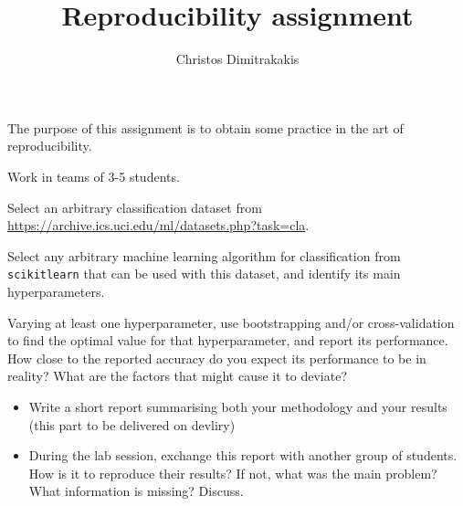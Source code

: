 \documentclass[a4paper]{article}
\title{Reproducibility assignment}
\author{Christos Dimitrakakis}
\begin{document}
\maketitle
The purpose of this assignment is to obtain some practice in the art of reproducibility.

\begin{exercise}
  Work in teams of 3-5 students.

  Select an arbitrary classification dataset from \url{https://archive.ics.uci.edu/ml/datasets.php?task=cla}. 

  Select any arbitrary machine learning algorithm for classification
  from \texttt{scikitlearn} that can be used with this dataset, and identify its main hyperparameters.
    
  Varying at least one hyperparameter, use bootstrapping and/or
  cross-validation to find the optimal value for that hyperparameter,
  and report its performance. How close to the reported accuracy do
  you expect its performance to be in reality?  What are the factors
  that might cause it to deviate?
  
  \begin{itemize}
  \item Write a short report summarising both your methodology and
    your results (this part to be delivered on devliry)

  \item During the lab session, exchange this report with another
    group of students.  How is it to reproduce their results? If not,
    what was the main problem? What information is missing? Discuss.
  \end{itemize}


\end{exercise}
\end{document}

